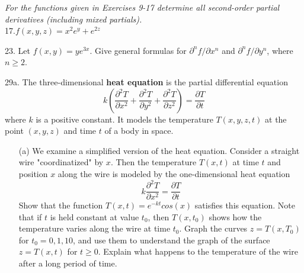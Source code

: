 \documentclass[12pt,letterpaper]{hmcpset}
\begin{document}
\newpage


\begin{problem}
\textit{For the functions given in Exercises 9-17 determine all second-order partial derivatives (including mixed partials).}
\\
17.$f(x,y, z)=x^2e^y+e^{2z}$

\end{problem}

\newpage


\begin{problem}
23. Let $f(x,y)=ye^{3x}$. Give general formulas for $\partial^nf/\partial x^n$ and $\partial^nf/\partial y^n$, where $n\geq2$.
\end{problem}

\newpage


\begin{problem}
29a. The three-dimensional \textbf{heat equation} is the partial differential equation
\begin{equation}
    k(\frac{\partial^2 T}{\partial x^2}+\frac{\partial^2 T}{\partial y^2}+\frac{\partial^2 T}{\partial z^2})=\frac{\partial T}{\partial t}
\end{equation}
where $k$ is a positive constant. It models the temperature $T(x, y, z, t)$ at the point $(x,y,z)$ and time $t$ of a body in space.

\begin{enumerate}
    \item[(a)] We examine a simplified version of the heat equation. Consider a straight wire "coordinatized" by $x$. Then the temperature $T(x,t)$ at time $t$ and position $x$ along the wire is modeled by the one-dimensional heat equation
    \begin{equation}
        k \frac{\partial^2 T}{\partial x^2}=\frac{\partial T}{\partial t}
    \end{equation}
    Show that the function $T(x,t)=e^{-kt}cos(x)$ satisfies this equation. Note that if $t$ is held constant at value $t_0$, then $T(x, t_0)$ shows how the temperature varies along the wire at time $t_0$. Graph the curves $z=T(x, T_0)$ for $t_0=0, 1, 10$, and use them to understand the graph of the surface $z=T(x,t)$ for $t\geq0$. Explain what happens to the temperature of the wire after a long period of time.
\end{enumerate}
\end{problem}

\newpage
\end{document}
